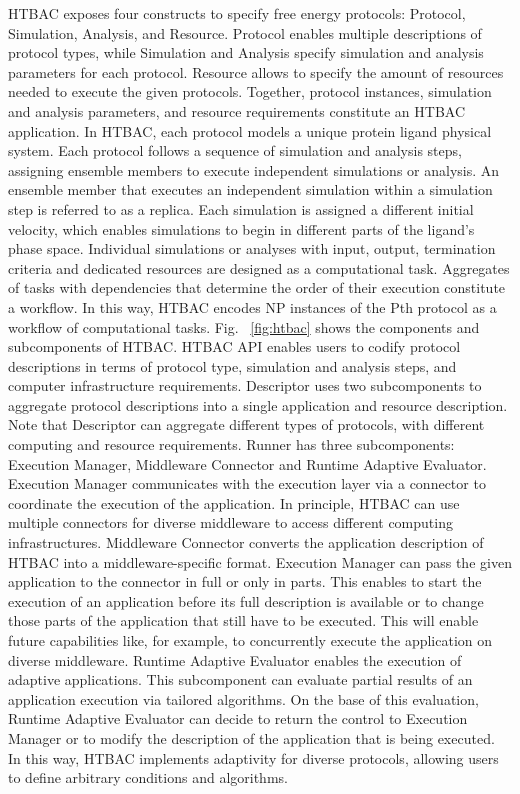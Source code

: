 HTBAC exposes four constructs to specify free energy protocols: Protocol, Simulation, Analysis, and Resource. Protocol enables multiple descriptions of protocol types, while Simulation and Analysis specify simulation and analysis parameters for each protocol. Resource allows to specify the amount of resources needed to execute the given protocols. Together, protocol instances, simulation and analysis parameters, and resource requirements constitute an HTBAC application.
In HTBAC, each protocol models a unique protein ligand physical system. Each protocol follows a sequence of simulation and analysis steps, assigning ensemble members to execute independent simulations or analysis. An ensemble member that executes an independent simulation within a simulation step is referred to as a replica. Each simulation is assigned a different initial velocity, which enables simulations to begin in different parts of the ligand’s phase space.
Individual simulations or analyses with input, output, termination criteria and dedicated resources are designed as a computational task. Aggregates of tasks with dependencies that determine the order of their execution constitute a workflow. In this way, HTBAC encodes NP instances of the Pth protocol as a workflow of computational tasks.
Fig. ~\ref{fig:htbac} shows the components and subcomponents of HTBAC. HTBAC API enables users to codify protocol descriptions in terms of protocol type, simulation and analysis steps, and computer infrastructure requirements. Descriptor uses two subcomponents to aggregate protocol descriptions into a single application and resource description. Note that Descriptor can aggregate different types of protocols, with different computing and resource requirements.
Runner has three subcomponents: Execution Manager, Middleware Connector and Runtime Adaptive Evaluator. Execution Manager communicates with the execution layer via a connector to coordinate the execution of the application. In principle, HTBAC can use multiple connectors for diverse middleware to access different computing infrastructures.
Middleware Connector converts the application description of HTBAC into a middleware-specific format. Execution Manager can pass the given application to the connector in full or only in parts. This enables to start the execution of an application before its full description is available or to
change those parts of the application that still have to be executed. This will enable future capabilities like, for example, to concurrently execute the application on diverse middleware.
Runtime Adaptive Evaluator enables the execution of adaptive applications. This subcomponent can evaluate partial results of an application execution via tailored algorithms. On the base of this evaluation, Runtime Adaptive Evaluator can decide to return the control to Execution Manager or to modify the description of the application that is being executed. In this way, HTBAC implements adaptivity for diverse protocols, allowing users to define arbitrary conditions and algorithms.
